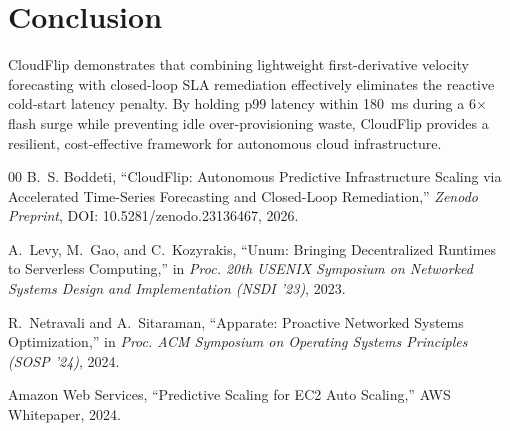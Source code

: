\documentclass[conference]{IEEEtran}
\begin{document}
\section{Conclusion}
CloudFlip demonstrates that combining lightweight first-derivative velocity forecasting with closed-loop SLA remediation effectively eliminates the reactive cold-start latency penalty. By holding p99 latency within 180~ms during a 6$\times$ flash surge while preventing idle over-provisioning waste, CloudFlip provides a resilient, cost-effective framework for autonomous cloud infrastructure.

\begin{thebibliography}{00}
B.~S. Boddeti, ``CloudFlip: Autonomous Predictive Infrastructure Scaling via Accelerated Time-Series Forecasting and Closed-Loop Remediation,'' \emph{Zenodo Preprint}, DOI: 10.5281/zenodo.23136467, 2026.

A.~Levy, M.~Gao, and C.~Kozyrakis, ``Unum: Bringing Decentralized Runtimes to Serverless Computing,'' in \emph{Proc. 20th USENIX Symposium on Networked Systems Design and Implementation (NSDI '23)}, 2023.

R.~Netravali and A.~Sitaraman, ``Apparate: Proactive Networked Systems Optimization,'' in \emph{Proc. ACM Symposium on Operating Systems Principles (SOSP '24)}, 2024.

Amazon Web Services, ``Predictive Scaling for EC2 Auto Scaling,'' AWS Whitepaper, 2024.
\end{thebibliography}
\end{document}
